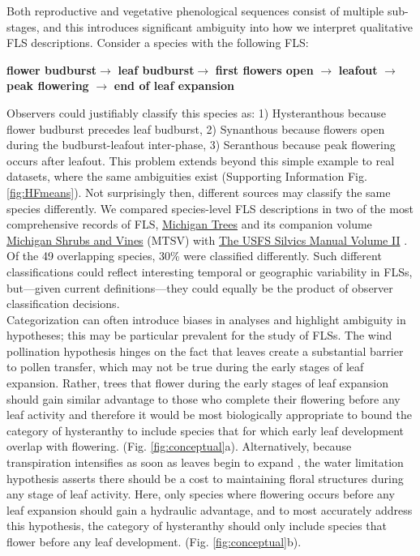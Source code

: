 \documentclass[11pt]{article}
\begin{document}
\noindent Both reproductive and vegetative phenological sequences consist of multiple sub-stages, and this introduces significant ambiguity into how we interpret qualitative FLS descriptions. Consider a species with the following FLS:\\

\begin{center}
\textbf{flower budburst}$\rightarrow$ \textbf{leaf budburst}$\rightarrow$ \textbf{first flowers open} $\rightarrow$ \textbf{leafout} $\rightarrow$ \textbf{peak flowering} $\rightarrow$ \textbf{end of leaf expansion} \\
\end{center}

\noindent Observers could justifiably classify this species as: 1) Hysteranthous because flower budburst precedes leaf budburst, 2) Synanthous because flowers open during the budburst-leafout inter-phase, 3) Seranthous because peak flowering occurs after leafout. This problem extends beyond this simple example to real datasets, \citep[e.g.][]{OKeefe2015} where the same ambiguities exist (Supporting Information Fig. \ref{fig:HFmeans}). Not surprisingly then, different sources may classify the same species differently. We compared species-level FLS descriptions in two of the most comprehensive records of FLS, \underline{Michigan Trees} and its companion volume \underline{Michigan Shrubs and Vines} (MTSV) \citep{Barnes2004,Barnes2016} with \underline{The USFS Silvics Manual Volume II} \citep{Burns1990}. Of the 49 overlapping species, 30\% were classified differently. Such different classifications could reflect interesting temporal or geographic variability in FLSs, but---given current definitions---they could equally be the product of observer classification decisions.\\

\noindent Categorization can often introduce biases in analyses \citep{Edwards2015} and highlight ambiguity in hypotheses; this may be particular prevalent for the study of FLSs. The wind pollination hypothesis hinges on the fact that leaves create a substantial barrier to pollen transfer, which may not be true during the early stages of leaf expansion. Rather, trees that flower during the early stages of leaf expansion should gain similar advantage to those who complete their flowering before any leaf activity and therefore it would be most biologically appropriate to bound the category of hysteranthy to include species that for which early leaf development overlap with flowering. (Fig. \ref{fig:conceptual}a). Alternatively, because transpiration intensifies as soon as leaves begin to expand \citep{%
Wang2018}, the water limitation  hypothesis asserts there should be a cost to maintaining floral structures during any stage of leaf activity. Here, only species where flowering occurs before any leaf expansion should gain a hydraulic advantage, and to most accurately address this hypothesis, the category of hysteranthy should only include species that flower before any leaf development. (Fig. \ref{fig:conceptual}b).\\ 
\end{document}
